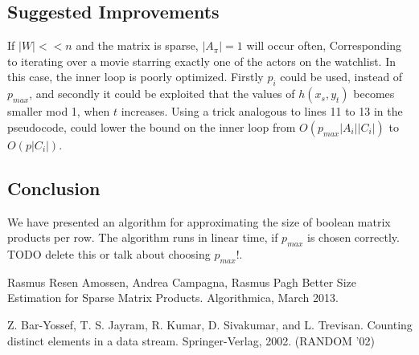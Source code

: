 \documentclass[a4paper,11pt]{article}
\begin{document}




%


\subsection{Suggested Improvements}
If $|W|<<n$ and the matrix is sparse, $|A_{\pi}|=1$ will occur often, Corresponding to iterating over a movie starring exactly one of the actors on the watchlist. In this case, the inner loop is poorly optimized. Firstly $p_i$ could be used, instead of $p_{max}$, and secondly it could be exploited that the values of $h(x_s, y_t)$ becomes smaller mod 1, when $t$ increases. Using a trick analogous to lines 11 to 13 in the pseudocode, could lower the bound on the inner loop from $O(p_{max}|A_i||C_i|)$ to $O(p|C_i|)$.



\subsection{Conclusion}
We have presented an algorithm for approximating the size of boolean matrix products per row. The algorithm runs in linear time, if $p_{max}$ is chosen correctly. TODO delete this or talk about choosing $p_{max}$!.

\begin{thebibliography}{}

Rasmus Resen Amossen, Andrea Campagna, Rasmus Pagh
Better Size Estimation for Sparse Matrix Products. Algorithmica, March 2013.

Z. Bar-Yossef, T. S. Jayram, R. Kumar, D. Sivakumar, and L. Trevisan.
Counting distinct elements in a data stream. Springer-Verlag, 2002. (RANDOM '02)

\end{thebibliography}
\end{document}
